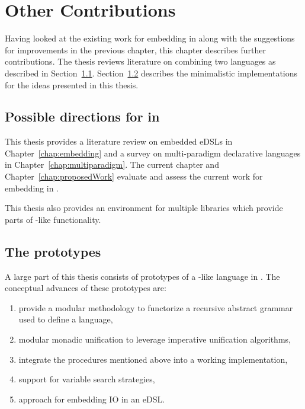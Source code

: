 \documentclass[thesis-solanki.tex]{subfiles}
\begin{document}
\chapter{Other Contributions}\label{chap:accomplishedWork}

Having looked at the existing work for embedding  in  along with the suggestions
for improvements in the previous chapter, this chapter describes further contributions.
The thesis reviews literature on combining two languages as described in Section~\ref{sec:work-in-points}.
Section~\ref{sec:prototypes} describes the minimalistic implementations for the ideas presented in this thesis.

\section{Possible directions for  in }\label{sec:work-in-points}

This thesis provides a literature review on embedded eDSLs in Chapter~\ref{chap:embedding} and
a survey on multi-paradigm declarative languages in Chapter~\ref{chap:multiparadigm}.
The current chapter and Chapter~\ref{chap:proposedWork} evaluate and assess the current work for embedding
 in .

This thesis also provides an environment for multiple  libraries which provide parts of
-like functionality.


\section{The prototypes}\label{sec:prototypes}
A large part of this thesis consists of prototypes of a -like language in .
The conceptual advances of these prototypes are:
\begin{enumerate}
\item provide a modular methodology to functorize a recursive abstract grammar used to define a language,

\item modular monadic unification to leverage imperative unification algorithms,

\item integrate the procedures mentioned above into a working  implementation,

\item support for variable search strategies,

\item approach for embedding IO in an eDSL.

\end{enumerate}
\end{document}
